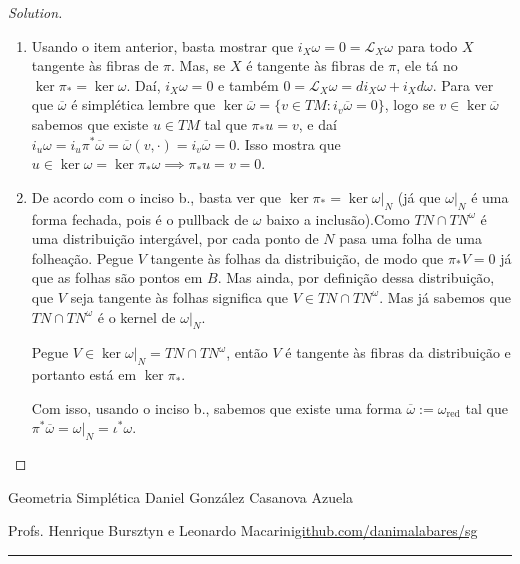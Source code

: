 \begin{proof}[Solution]
\begin{enumerate}[label=\alph*.]
\vspace{1em}
Para concluir este exercício suponha que $\omega$ é fechada e que $\ker \pi_*\subseteq \ker \omega$. Pegue $X$ tangente às fibras de $\pi$; vimos acima que $\pi_*X=0$, então $X\in\ker \omega$, i.e. $i_X\omega=0$ e também $0=\mathcal{L}_{X}\omega =di_X\omega+i_Xd\omega$.

\item Usando o item anterior, basta mostrar que $i_X\omega =0=\mathcal{L}_{X}\omega$ para todo $X$ tangente às fibras de $\pi$. Mas, se $X$ é tangente às fibras de $\pi$, ele tá no $\ker \pi_*=\ker \omega$. Daí, $i_X\omega=0$ e também $0=\mathcal{L}_{X}\omega=di_X\omega+i_Xd\omega$. Para ver que $\overline{\omega}$ é simplética lembre que $\ker \overline{\omega}=\{v\in TM: i_{v}\overline{\omega}=0\}$, logo se $v\in\ker \overline{\omega}$ sabemos que existe $u\in TM$ tal que $\pi_*u=v$, e daí $i_u\omega=i_u\pi^*\overline{\omega}=\overline{\omega}(v,\cdot )=i_v\overline{\omega}=0$. Isso mostra que $u\in\ker \omega=\ker \pi_*\omega\implies \pi_*u=v=0$.

	\item De acordo com o inciso b., basta ver que $\ker \pi_*=\ker \omega|_{N}$ (já que $\omega|_{N}$ é uma forma fechada, pois é o pullback de $\omega$ baixo a inclusão).Como $TN\cap TN^\omega$ é uma distribuição intergável, por cada ponto de $N$ pasa uma folha de uma folheação. Pegue $V$ tangente às folhas da distribuição, de modo que  $\pi_*V=0$ já que as folhas são pontos em $B$. Mas ainda, por definição dessa distribuição, que $V$ seja tangente às folhas significa que $V\in TN\cap TN^\omega$. Mas já sabemos que $TN\cap TN^{\omega}$ é o kernel de $\omega|_{N}$.

		Pegue $V\in\ker \omega |_{N}=TN\cap TN^\omega$, então $V$ é tangente às fibras da distribuição e portanto está em $\ker \pi_*$.

		Com isso, usando o inciso b., sabemos que existe uma forma  $\overline{\omega}:=\omega_{\operatorname{red}}$ tal que $\pi^*\overline{\omega}=\omega|_{N}=\iota^*\omega$.

\end{enumerate}	
\end{proof}

\clearpage
\begin{minipage}{\textwidth}
	\begin{minipage}{1\textwidth}
		Geometria Simpl\'etica \hfill Daniel González Casanova Azuela
		
		{\small Profs. Henrique Bursztyn e Leonardo Macarini\hfill\href{https://github.com/danimalabares/sg}{github.com/danimalabares/sg}}
	\end{minipage}
\end{minipage}\vspace{.2cm}\hrule

